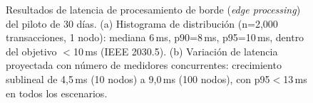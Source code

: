 \begin{figure}[ht]
{%
}%
\caption{Resultados de latencia de procesamiento de borde (\textit{edge processing}) del piloto de 30 d\'{i}as. (a) Histograma de distribuci\'{o}n (n=2{,}000 transacciones, 1 nodo): mediana 6\,ms, p90=8\,ms, p95=10\,ms, dentro del objetivo $<$10\,ms (IEEE 2030.5). (b) Variaci\'{o}n de latencia proyectada con n\'{u}mero de medidores concurrentes: crecimiento sublineal de 4,5\,ms (10 nodos) a 9,0\,ms (100 nodos), con p95$<$13\,ms en todos los escenarios.}
\label{fig:latency-results}
\end{figure}
